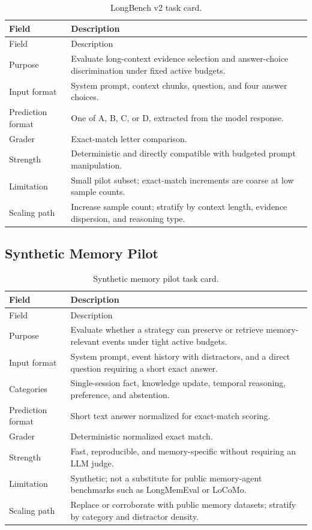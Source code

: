 \documentclass[11pt]{article}
\begin{document}
\begin{longtable}{L{0.24\textwidth}L{0.66\textwidth}}
\caption{LongBench v2 task card.}\label{tab:task_longbench_card}\\
\toprule
Field & Description \\
\midrule
\endfirsthead
\toprule
Field & Description \\
\midrule
\endhead
Purpose & Evaluate long-context evidence selection and answer-choice discrimination under fixed active budgets. \\
Input format & System prompt, context chunks, question, and four answer choices. \\
Prediction format & One of A, B, C, or D, extracted from the model response. \\
Grader & Exact-match letter comparison. \\
Strength & Deterministic and directly compatible with budgeted prompt manipulation. \\
Limitation & Small pilot subset; exact-match increments are coarse at low sample counts. \\
Scaling path & Increase sample count; stratify by context length, evidence dispersion, and reasoning type. \\
\bottomrule
\end{longtable}

\subsection{Synthetic Memory Pilot}

\begin{longtable}{L{0.24\textwidth}L{0.66\textwidth}}
\caption{Synthetic memory pilot task card.}\label{tab:task_synth_memory_card}\\
\toprule
Field & Description \\
\midrule
\endfirsthead
\toprule
Field & Description \\
\midrule
\endhead
Purpose & Evaluate whether a strategy can preserve or retrieve memory-relevant events under tight active budgets. \\
Input format & System prompt, event history with distractors, and a direct question requiring a short exact answer. \\
Categories & Single-session fact, knowledge update, temporal reasoning, preference, and abstention. \\
Prediction format & Short text answer normalized for exact-match scoring. \\
Grader & Deterministic normalized exact match. \\
Strength & Fast, reproducible, and memory-specific without requiring an LLM judge. \\
Limitation & Synthetic; not a substitute for public memory-agent benchmarks such as LongMemEval or LoCoMo. \\
Scaling path & Replace or corroborate with public memory datasets; stratify by category and distractor density. \\
\bottomrule
\end{longtable}
\end{document}
